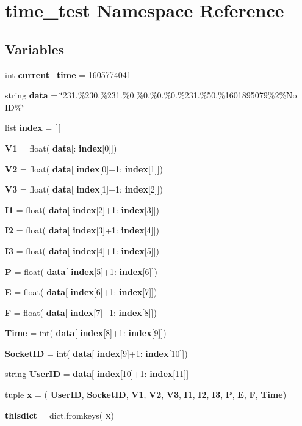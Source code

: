 \section{time\+\_\+test Namespace Reference}
\label{namespacetime__test}
\subsection*{Variables}
\begin{DoxyCompactItemize}
\item 
int \textbf{ current\+\_\+time} = 1605774041
\item 
string \textbf{ data} = \char`\"{}231.\%230.\%231.\%0.\%0.\%0.\%0.\%231.\%50.\%1601895079\%2\%No ID\%\char`\"{}
\item 
list \textbf{ index} = [$\,$]
\item 
\textbf{ V1} = float(\textbf{ data}[\+:\textbf{ index}[0]])
\item 
\textbf{ V2} = float(\textbf{ data}[\textbf{ index}[0]+1\+:\textbf{ index}[1]])
\item 
\textbf{ V3} = float(\textbf{ data}[\textbf{ index}[1]+1\+:\textbf{ index}[2]])
\item 
\textbf{ I1} = float(\textbf{ data}[\textbf{ index}[2]+1\+:\textbf{ index}[3]])
\item 
\textbf{ I2} = float(\textbf{ data}[\textbf{ index}[3]+1\+:\textbf{ index}[4]])
\item 
\textbf{ I3} = float(\textbf{ data}[\textbf{ index}[4]+1\+:\textbf{ index}[5]])
\item 
\textbf{ P} = float(\textbf{ data}[\textbf{ index}[5]+1\+:\textbf{ index}[6]])
\item 
\textbf{ E} = float(\textbf{ data}[\textbf{ index}[6]+1\+:\textbf{ index}[7]])
\item 
\textbf{ F} = float(\textbf{ data}[\textbf{ index}[7]+1\+:\textbf{ index}[8]])
\item 
\textbf{ Time} = int(\textbf{ data}[\textbf{ index}[8]+1\+:\textbf{ index}[9]])
\item 
\textbf{ Socket\+ID} = int(\textbf{ data}[\textbf{ index}[9]+1\+:\textbf{ index}[10]])
\item 
string \textbf{ User\+ID} = \textbf{ data}[\textbf{ index}[10]+1\+:\textbf{ index}[11]]
\item 
tuple \textbf{ x} = (\textquotesingle{}\textbf{ User\+ID}\textquotesingle{}, \textquotesingle{}\textbf{ Socket\+ID}\textquotesingle{}, \textquotesingle{}\textbf{ V1}\textquotesingle{}, \textquotesingle{}\textbf{ V2}\textquotesingle{}, \textquotesingle{}\textbf{ V3}\textquotesingle{}, \textquotesingle{}\textbf{ I1}\textquotesingle{}, \textquotesingle{}\textbf{ I2}\textquotesingle{}, \textquotesingle{}\textbf{ I3}\textquotesingle{}, \textquotesingle{}\textbf{ P}\textquotesingle{}, \textquotesingle{}\textbf{ E}\textquotesingle{}, \textquotesingle{}\textbf{ F}\textquotesingle{}, \textquotesingle{}\textbf{ Time}\textquotesingle{})
\item 
\textbf{ thisdict} = dict.\+fromkeys(\textbf{ x})
\end{DoxyCompactItemize}



